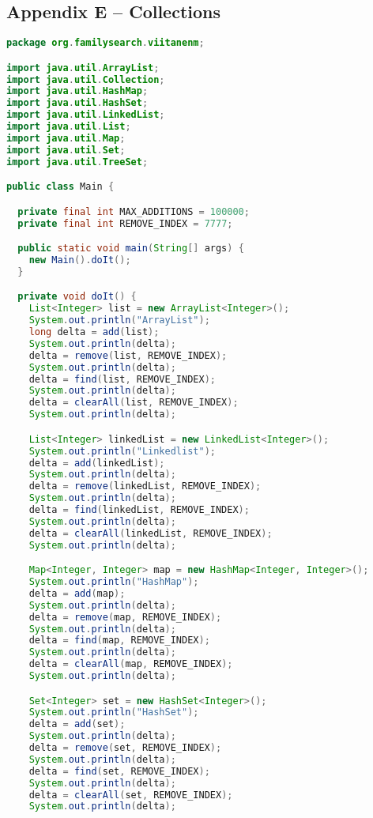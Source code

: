 \subsection*{Appendix E -- Collections} \label{App:AppendixE}
\begin{lstlisting}[language=Java]
package org.familysearch.viitanenm;

import java.util.ArrayList;
import java.util.Collection;
import java.util.HashMap;
import java.util.HashSet;
import java.util.LinkedList;
import java.util.List;
import java.util.Map;
import java.util.Set;
import java.util.TreeSet;

public class Main {

  private final int MAX_ADDITIONS = 100000;
  private final int REMOVE_INDEX = 7777;

  public static void main(String[] args) {
    new Main().doIt();
  }

  private void doIt() {
    List<Integer> list = new ArrayList<Integer>();
    System.out.println("ArrayList");
    long delta = add(list);
    System.out.println(delta);
    delta = remove(list, REMOVE_INDEX);
    System.out.println(delta);
    delta = find(list, REMOVE_INDEX);
    System.out.println(delta);
    delta = clearAll(list, REMOVE_INDEX);
    System.out.println(delta);

    List<Integer> linkedList = new LinkedList<Integer>();
    System.out.println("Linkedlist");
    delta = add(linkedList);
    System.out.println(delta);
    delta = remove(linkedList, REMOVE_INDEX);
    System.out.println(delta);
    delta = find(linkedList, REMOVE_INDEX);
    System.out.println(delta);
    delta = clearAll(linkedList, REMOVE_INDEX);
    System.out.println(delta);

    Map<Integer, Integer> map = new HashMap<Integer, Integer>();
    System.out.println("HashMap");
    delta = add(map);
    System.out.println(delta);
    delta = remove(map, REMOVE_INDEX);
    System.out.println(delta);
    delta = find(map, REMOVE_INDEX);
    System.out.println(delta);
    delta = clearAll(map, REMOVE_INDEX);
    System.out.println(delta);

    Set<Integer> set = new HashSet<Integer>();
    System.out.println("HashSet");
    delta = add(set);
    System.out.println(delta);
    delta = remove(set, REMOVE_INDEX);
    System.out.println(delta);
    delta = find(set, REMOVE_INDEX);
    System.out.println(delta);
    delta = clearAll(set, REMOVE_INDEX);
    System.out.println(delta);


\end{lstlisting}
